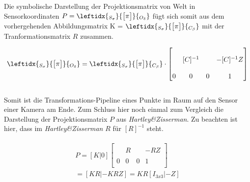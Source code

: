 		Die symbolische Darstellung der Projektionsmatrix von Welt in Sensorkoordinaten $	P = \leftidx{_{S_\sigma}}{\begin{bmatrix}
			\pi
			\end{bmatrix}}{_{O_\delta}}$ fügt sich somit aus dem vorhergehenden Abbildungsmatrix 
		K = $\leftidx{_{S_\sigma}}{\begin{bmatrix}
				\pi
		\end{bmatrix}}{_{C_\beta}}$ mit der Tranformationsmatrix $R$ zusammen.
		
		\begin{gather}
		\leftidx{_{S_\sigma}}{\begin{bmatrix}
			\pi
			\end{bmatrix}}{_{O_\delta}}
		=
		\leftidx{_{S_\sigma}}{\begin{bmatrix}
			\pi
			\end{bmatrix}}{_{C_\beta}}
		\cdot
		\begin{bmatrix}
		&&&\\
		&[C]^{-1}&& -[C]^{-1} Z\\
		&&&\\
		0&0&0&1\\
		\end{bmatrix}
		\end{gather}\\
		
	Somit ist die Transformations-Pipeline eines Punkte im Raum auf den Sensor einer Kamera am Ende. 
Zum Schluss hier noch einmal zum Vergleich die Darstellung der Projektionsmatrix $P$ aus \textit{Hartley\&Zisserman}\cite{HZ}. Zu beachten ist hier, dass im \textit{Hartley\&Zisserman} $R$ für $[R]^{-1}$ steht\cite{HZ}.
		
		\begin{gather}
		\begin{split}	
		P=
		[K|0] \begin{bmatrix}
		&&&\\
		&R&&-RZ\\
		&&&\\
		0&0&0&1\\
		\end{bmatrix}\\
		=[KR|-KRZ] 	= KR[I_{3x3}|-Z]
		\end{split}
		\end{gather}

